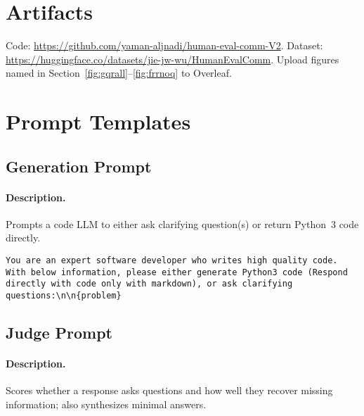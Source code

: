 \documentclass[acmsmall,screen,nonacm]{acmart}
\begin{document}
\section*{Artifacts}
Code: \url{https://github.com/yaman-aljnadi/human-eval-comm-V2}. Dataset: \url{https://huggingface.co/datasets/jie-jw-wu/HumanEvalComm}. Upload figures named in Section~\ref{fig:gqrall}--\ref{fig:frrnoq} to Overleaf.



\appendix
\section{Prompt Templates}


\subsection{Generation Prompt}
\paragraph{Description.}
Prompts a code LLM to either ask clarifying question(s) or return Python~3 code directly.

\begin{lstlisting}[style=promptcode]
    You are an expert software developer who writes high quality code. With below information, please either generate Python3 code (Respond directly with code only with markdown), or ask clarifying questions:\n\n{problem}
\end{lstlisting}

\subsection{Judge Prompt}
\paragraph{Description.}
Scores whether a response asks questions and how well they recover missing information; also synthesizes minimal answers.
\end{document}
